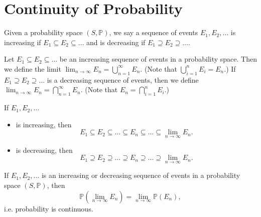 \chapter{Continuity of Probability}
\begin{definition}
    Given a probability space \((S, \mathbb{P} )\), we say a sequence of events \(E_1, E_2, \dots \) is increasing if \(E_1 \subseteq E_2 \subseteq \dots \) and is decreasing if \(E_1 \supseteq E_2 \supseteq \dots \).    
\end{definition}

\begin{definition}
    Let \(E_1 \subseteq E_2 \subseteq \dots \) be an increasing sequence of events in a probability space. Then we define the limit \(\lim_{n \to \infty} E_n = \bigcup_{n=1}^{\infty} E_n  \). (Note that \(\bigcup_{i=1}^{n} E_i = E_n \).) If \(E_1 \supseteq E_2 \supseteq \dots \) is a decreasing sequence of events, then we define \(\lim_{n \to \infty} E_n = \bigcap_{n=1}^{\infty} E_n  \). (Note that \(E_n = \bigcap_{i=1}^{n} E_i \).)  
\end{definition}

\begin{remark}
    If \(E_1, E_2, \dots \)
    \begin{itemize}
        \item is increasing, then 
        \[
            E_1 \subseteq E_2 \subseteq \dots \subseteq E_n \subseteq \dots \subseteq \lim_{n \to \infty} E_n. 
        \]
        \item is decreasing, then 
        \[
            E_1 \supseteq E_2 \supseteq \dots \supseteq E_n \supseteq \dots \supseteq \lim_{n \to \infty} E_n. 
        \]
    \end{itemize} 
\end{remark}

\begin{proposition}
    If \(E_1, E_2, \dots \) is an increasing or decreasing sequence of events in a probability space \((S, \mathbb{P} )\), then 
    \[
        \mathbb{P} \left( \lim_{n \to \infty} E_n  \right) = \lim_{n \to \infty} \mathbb{P} (E_n),  
    \]  
    i.e. probability is continuous.
\end{proposition}

